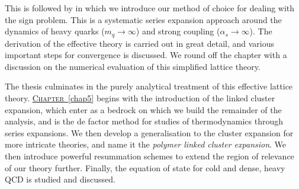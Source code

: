 This is followed by  in which we introduce our method of choice
for dealing with the sign problem. This is a systematic series expansion
approach around the dynamics of heavy quarks ($m_q \to \infty$) and strong
coupling ($\alpha_s \to \infty$). The derivation of the effective theory is carried out
in great detail, and various important steps for convergence is discussed. We
round off the chapter with a discussion on the numerical evaluation of this
simplified lattice theory.

The thesis culminates in the purely analytical treatment of this effective
lattice theory. \hyperref[chap5]{\mbox{\textsc{Chapter} \ref*{chap5}}} begins
with the introduction of the linked cluster expansion, which enter as a bedrock
on which we build the remainder of the analysis, and is the de factor method for
studies of thermodynamics through series expansions. We then develop a
generalisation to the cluster expansion for more intricate theories, and name it
the \emph{polymer linked cluster expansion}. We then introduce powerful
resummation schemes to extend the region of relevance of our theory further.
Finally, the equation of state for cold and dense, heavy QCD is studied and
discussed.
